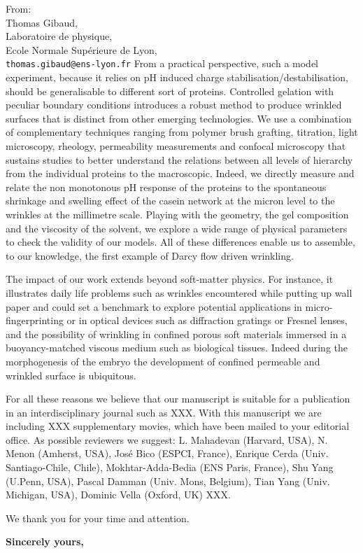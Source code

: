 \documentclass[a4paper, parskip=true, firsthead=false, fromemail=true, foldmarks=false]{scrlttr2}
\begin{document}
\begin{letter}{From:\\
Thomas Gibaud,\\
Laboratoire de physique,\\
Ecole Normale Supérieure de Lyon,\\
\texttt{thomas.gibaud@ens-lyon.fr}
}
From a practical perspective, such a model experiment, because it relies on pH induced charge stabilisation/destabilisation, should be generalisable to different sort of proteins. Controlled gelation with peculiar boundary conditions introduces a robust method to produce wrinkled surfaces that is distinct from other emerging technologies. We use a combination of complementary techniques ranging from polymer brush grafting, titration, light microscopy, rheology, permeability measurements and confocal microscopy that sustains studies to better understand the relations between all levels of hierarchy from the individual proteins to the macroscopic. Indeed, we directly measure and relate the non monotonous pH response of the proteins to the spontaneous shrinkage and swelling effect of the casein network at the micron level to the wrinkles at the millimetre scale. Playing with the geometry, the gel composition and the viscosity of the solvent, we explore a wide range of physical parameters to check the validity of our models. All of these differences enable us to assemble, to our knowledge, the first example of Darcy flow driven wrinkling.

The impact of our work extends beyond soft-matter physics. For instance, it illustrates daily life problems such as wrinkles encountered while putting up wall paper and could set a benchmark to explore potential applications in micro-fingerprinting or in optical devices such as diffraction gratings or Fresnel lenses, and the possibility of wrinkling in confined porous soft materials immersed in a buoyancy-matched viscous medium such as biological tissues. Indeed during the morphogenesis of the embryo the development of confined permeable and wrinkled surface is ubiquitous.


For all these reasons we believe that our manuscript is suitable for a publication in an interdisciplinary journal such as XXX. With this manuscript we are including XXX supplementary movies, which have been mailed to your editorial office. As possible reviewers we suggest: L. Mahadevan (Harvard, USA), N. Menon (Amherst, USA), José Bico (ESPCI, France), Enrique Cerda (Univ. Santiago-Chile, Chile), Mokhtar-Adda-Bedia (ENS Paris, France), Shu Yang (U.Penn, USA), Pascal Damman (Univ. Mons, Belgium), Tian Yang (Univ. Michigan, USA), Dominic Vella (Oxford, UK) XXX.

 

We thank you for your time and attention.

\closing{\bf Sincerely yours,} 

\end{letter} 
\end{document}
